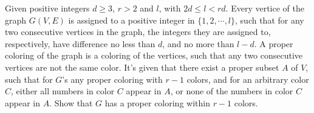 Given positive integers $d \ge 3$, $r>2$ and $l$, with $2d \le l <rd$. Every vertice of the graph $G(V,E)$ is assigned to a positive integer in $\{1,2,\cdots,l\}$, such that for any two consecutive vertices in the graph, the integers they are assigned to, respectively, have difference no less than $d$, and no more than $l-d$.
A proper coloring of the graph is a coloring of the vertices, such that any two consecutive vertices are not the same color. It's given that there exist a proper subset $A$ of $V$, such that for $G$'s any proper coloring with $r-1$ colors, and for an arbitrary color $C$, either all numbers in color $C$ appear in $A$, or none of the numbers in color $C$ appear in $A$.
Show that $G$ has a proper coloring within $r-1$ colors.